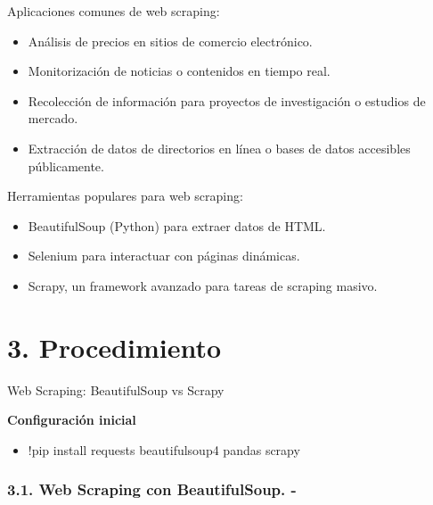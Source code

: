 \documentclass[
  letterpaper,
  DIV=11,
  numbers=noendperiod]{scrartcl}
\providecommand{\tightlist}{%
  \setlength{\itemsep}{0pt}\setlength{\parskip}{0pt}}\usepackage{longtable,booktabs,array}
\begin{document}
Aplicaciones comunes de web scraping:

\begin{itemize}
\tightlist
\item
  Análisis de precios en sitios de comercio electrónico.
\item
  Monitorización de noticias o contenidos en tiempo real.
\item
  Recolección de información para proyectos de investigación o estudios
  de mercado.
\item
  Extracción de datos de directorios en línea o bases de datos
  accesibles públicamente.
\end{itemize}

Herramientas populares para web scraping:

\begin{itemize}
\tightlist
\item
  BeautifulSoup (Python) para extraer datos de HTML.
\item
  Selenium para interactuar con páginas dinámicas.
\item
  Scrapy, un framework avanzado para tareas de scraping masivo.
\end{itemize}

\section{3. Procedimiento}\label{procedimiento}

Web Scraping: BeautifulSoup vs Scrapy

\textbf{Configuración inicial}

\begin{itemize}
\tightlist
\item
  !pip install requests beautifulsoup4 pandas scrapy
\end{itemize}

\subsubsection{3.1. Web Scraping con BeautifulSoup.
-}\label{web-scraping-con-beautifulsoup.--}
\end{document}
